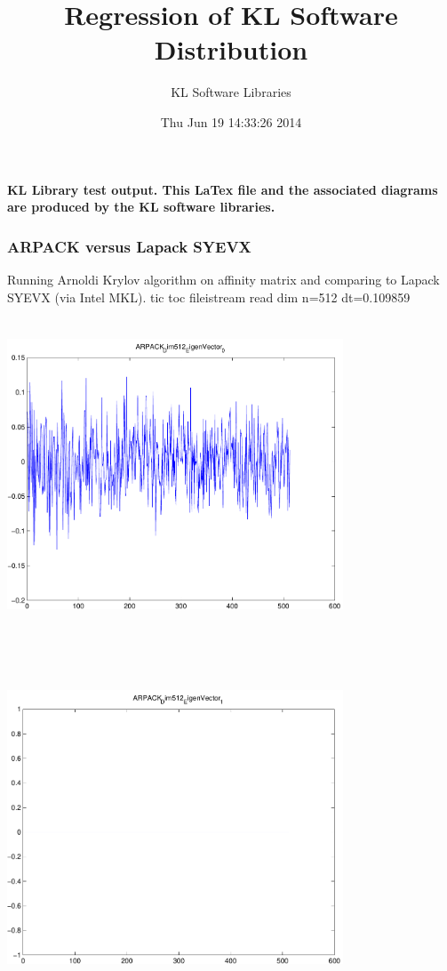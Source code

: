 \documentclass[9pt]{article}
\theoremstyle{plain}
\theoremstyle{definition}
\theoremstyle{remark}
\numberwithin{equation}{section}
\begin{document}
\title{Regression of KL Software Distribution   }
\author{KL Software Libraries}
\date{Thu Jun 19 14:33:26 2014
}
\maketitle
\textbf{ KL Library test output.  This LaTex file and the associated diagrams are produced by the KL software libraries.}
\subsubsection{ARPACK versus Lapack SYEVX}
Running Arnoldi Krylov algorithm on affinity matrix and comparing to Lapack SYEVX (via Intel MKL).
tic toc fileistream read dim n=512 dt=0.109859
\includegraphics[width=10.0cm,height=10.0cm]{ARPACK_Dim512_EigenVector_0.pdf}

\includegraphics[width=10.0cm,height=10.0cm]{ARPACK_Dim512_EigenVector_1.pdf}
\end{document}
